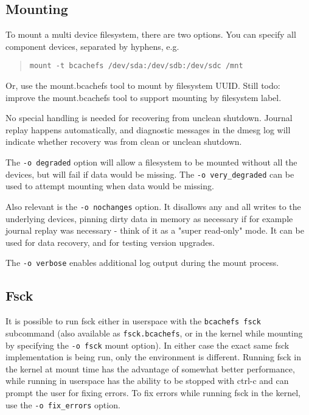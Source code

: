 \documentclass{article}
\begin{document}
\subsection{Mounting}

To mount a multi device filesystem, there are two options. You can specify all
component devices, separated by hyphens, e.g. 
\begin{quote} \begin{verbatim}
mount -t bcachefs /dev/sda:/dev/sdb:/dev/sdc /mnt
\end{verbatim} \end{quote}
Or, use the mount.bcachefs tool to mount by filesystem UUID. Still todo: improve
the mount.bcachefs tool to support mounting by filesystem label.

No special handling is needed for recovering from unclean shutdown. Journal
replay happens automatically, and diagnostic messages in the dmesg log will
indicate whether recovery was from clean or unclean shutdown.

The \texttt{-o degraded} option will allow a filesystem to be mounted without
all the devices, but will fail if data would be missing. The
\texttt{-o very\_degraded} can be used to attempt mounting when data would be
missing.

Also relevant is the \texttt{-o nochanges} option. It disallows any and all
writes to the underlying devices, pinning dirty data in memory as necessary if
for example journal replay was necessary - think of it as a "super read-only"
mode. It can be used for data recovery, and for testing version upgrades.

The \texttt{-o verbose} enables additional log output during the mount process.

\subsection{Fsck}

It is possible to run fsck either in userspace with the \texttt{bcachefs fsck}
subcommand (also available as \texttt{fsck.bcachefs}, or in the kernel while
mounting by specifying the \texttt{-o fsck} mount option). In either case the
exact same fsck implementation is being run, only the environment is different.
Running fsck in the kernel at mount time has the advantage of somewhat better
performance, while running in userspace has the ability to be stopped with
ctrl-c and can prompt the user for fixing errors. To fix errors while running
fsck in the kernel, use the \texttt{-o fix\_errors} option.
\end{document}
